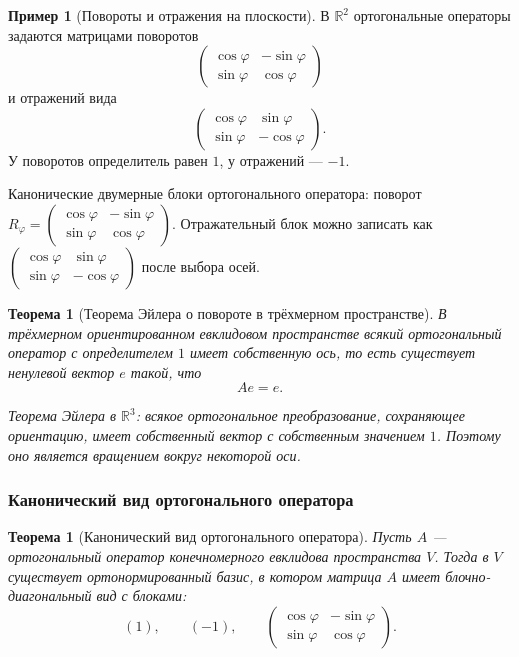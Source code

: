 \documentclass[12pt,a4paper]{article}
\theoremstyle{definition}
\newtheorem{example}[definition]{Пример}
\theoremstyle{plain}
\newtheorem{theorem}[definition]{Теорема}
\theoremstyle{remark}
\newenvironment{knowledgefix}{\begin{clarifybox}}{\end{clarifybox}}
\newcommand{\R}{\mathbb{R}}
\begin{document}
\begin{example}[Повороты и отражения на плоскости]
В $\R^2$ ортогональные операторы задаются матрицами поворотов
\[
    \begin{pmatrix}
        \cos\varphi & -\sin\varphi\\
        \sin\varphi & \cos\varphi
    \end{pmatrix}
\]
и отражений вида
\[
    \begin{pmatrix}
        \cos\varphi & \sin\varphi\\
        \sin\varphi & -\cos\varphi
    \end{pmatrix}.
\]
У поворотов определитель равен $1$, у отражений --- $-1$.
\begin{knowledgefix}
Канонические двумерные блоки ортогонального оператора: поворот \(R_\varphi=\begin{pmatrix}\cos\varphi&-\sin\varphi\\\sin\varphi&\cos\varphi\end{pmatrix}\). Отражательный блок можно записать как \(\begin{pmatrix}\cos\varphi&\sin\varphi\\\sin\varphi&-\cos\varphi\end{pmatrix}\) после выбора осей.
\end{knowledgefix}
\end{example}

\begin{theorem}[Теорема Эйлера о повороте в трёхмерном пространстве]
В трёхмерном ориентированном евклидовом пространстве всякий ортогональный оператор с определителем $1$ имеет собственную ось, то есть существует ненулевой вектор $e$ такой, что
\[
    Ae=e.
\]
\begin{knowledgefix}
Теорема Эйлера в \(\R^3\): всякое ортогональное преобразование, сохраняющее ориентацию, имеет собственный вектор с собственным значением \(1\). Поэтому оно является вращением вокруг некоторой оси.
\end{knowledgefix}
\end{theorem}

\subsubsection{Канонический вид ортогонального оператора}


\begin{theorem}[Канонический вид ортогонального оператора]
Пусть $A$ --- ортогональный оператор конечномерного евклидова пространства $V$.
Тогда в $V$ существует ортонормированный базис, в котором матрица $A$ имеет блочно-диагональный вид с блоками:
\[
    (1),
    \qquad
    (-1),
    \qquad
    \begin{pmatrix}
        \cos\varphi & -\sin\varphi\\
        \sin\varphi & \cos\varphi
    \end{pmatrix}.
\]
\end{theorem}
\end{document}
